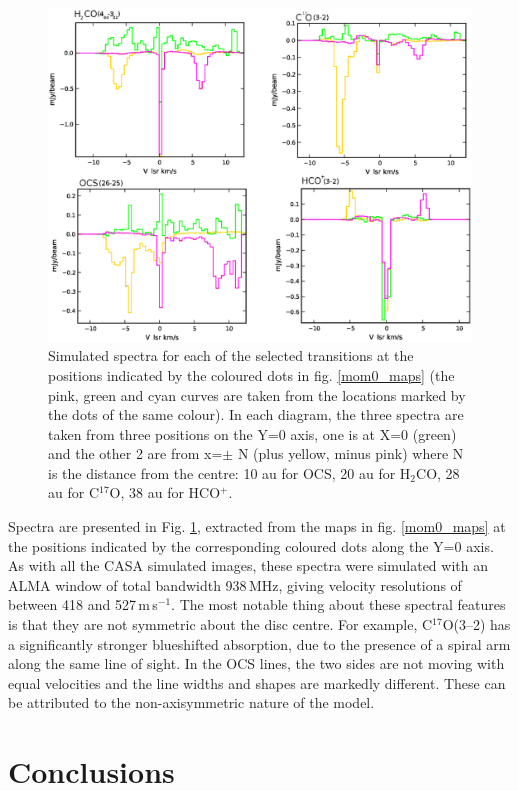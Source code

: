 \documentclass[useAMS,usenatbib]{mn2e}
\begin{document}
\begin{figure}
 \includegraphics[width=168mm]{Figures/sim/casa_all_spectra2.eps}
 \caption{Simulated spectra for each of the selected transitions at the positions indicated by the coloured dots in fig. \ref{mom0_maps} (the pink, green and cyan curves are taken from the locations marked by the dots of the same colour). In each diagram, the three spectra are taken from three positions on the Y=0 axis, one is at X=0 (green) and the other 2 are from x=$\pm$ N (plus yellow, minus pink) where N is the distance from the centre: 10 au for OCS, 20 au for H$_2$CO, 28 au for C$^{17}$O, 38 au for HCO$^+$.}
 \label{spectra}
\end{figure}

Spectra are presented in Fig. \ref{spectra}, extracted from the maps in fig. \ref{mom0_maps} at the positions indicated by the corresponding coloured dots along the Y=0 axis. As with all the CASA simulated images, these spectra were simulated with an ALMA window of total bandwidth 938$\,$MHz, giving velocity resolutions of between 418 and 527\,m\,s$^{-1}$. The most notable thing about these spectral features is that they are not symmetric about the disc centre. For example, C$^{17}$O(3--2) has a significantly stronger blueshifted absorption, due to the presence of a spiral arm along the same line of sight. In the OCS lines, the two sides are not moving with equal velocities and the line widths and shapes are markedly different. These can be attributed to the non-axisymmetric nature of the model.

\section{Conclusions} \label{sec:discussion}
\end{document}
